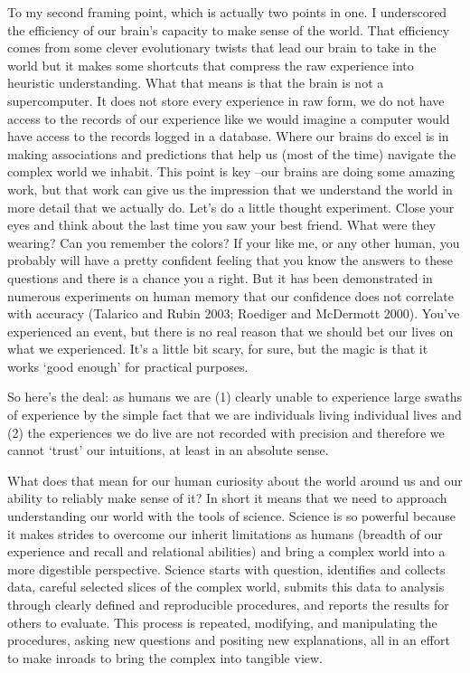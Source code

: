 \documentclass[
  letterpaper,
]{scrbook}
\begin{document}
To my second framing point, which is actually two points in one. I
underscored the efficiency of our brain's capacity to make sense of the
world. That efficiency comes from some clever evolutionary twists that
lead our brain to take in the world but it makes some shortcuts that
compress the raw experience into heuristic understanding. What that
means is that the brain is not a supercomputer. It does not store every
experience in raw form, we do not have access to the records of our
experience like we would imagine a computer would have access to the
records logged in a database. Where our brains do excel is in making
associations and predictions that help us (most of the time) navigate
the complex world we inhabit. This point is key --our brains are doing
some amazing work, but that work can give us the impression that we
understand the world in more detail that we actually do. Let's do a
little thought experiment. Close your eyes and think about the last time
you saw your best friend. What were they wearing? Can you remember the
colors? If your like me, or any other human, you probably will have a
pretty confident feeling that you know the answers to these questions
and there is a chance you a right. But it has been demonstrated in
numerous experiments on human memory that our confidence does not
correlate with accuracy (Talarico and Rubin 2003; Roediger and McDermott
2000). You've experienced an event, but there is no real reason that we
should bet our lives on what we experienced. It's a little bit scary,
for sure, but the magic is that it works `good enough' for practical
purposes.

So here's the deal: as humans we are (1) clearly unable to experience
large swaths of experience by the simple fact that we are individuals
living individual lives and (2) the experiences we do live are not
recorded with precision and therefore we cannot `trust' our intuitions,
at least in an absolute sense.

What does that mean for our human curiosity about the world around us
and our ability to reliably make sense of it? In short it means that we
need to approach understanding our world with the tools of science.
Science is so powerful because it makes strides to overcome our inherit
limitations as humans (breadth of our experience and recall and
relational abilities) and bring a complex world into a more digestible
perspective. Science starts with question, identifies and collects data,
careful selected slices of the complex world, submits this data to
analysis through clearly defined and reproducible procedures, and
reports the results for others to evaluate. This process is repeated,
modifying, and manipulating the procedures, asking new questions and
positing new explanations, all in an effort to make inroads to bring the
complex into tangible view.
\end{document}
